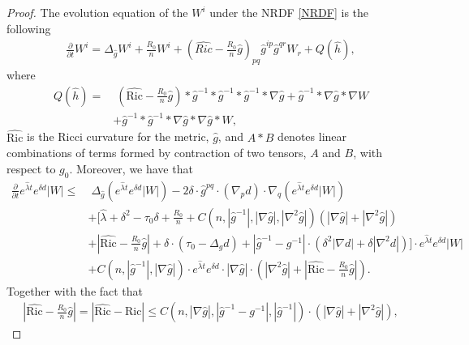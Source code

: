 \documentclass[12pt]{amsart}
\begin{document}
\begin{proof}
The evolution equation of the $W^{i}$ under the NRDF \eqref{NRDF} is the following 
\begin{align}
    \frac{\partial}{\partial t} W^{i} = \Delta_{\hat{g}} W^{i} + \frac{R_0}{n}W^{i} + (\hat{Ric} - \frac{R_0}{n} \hat{g})_{pq} \hat{g}^{ip} \hat{g}^{qr}W_{r} + Q(\hat{h}),
\end{align}
where 
\begin{equation}
    \begin{split}
        Q(\hat{h}) 
        =&\; (\hat{\mathrm{Ric}} - \frac{R_0}{n}\hat{g}) * \hat{g}^{-1}* \hat{g}^{-1}* \hat{g}^{-1}*\nabla\hat{g} + \hat{g}^{-1} * \nabla\hat{g} * \nabla W\\
        &+ \hat{g}^{-1}* \hat{g}^{-1} * \nabla\hat{g} * \nabla\hat{g} * W,
    \end{split}
\end{equation}
$\hat{\mathrm{Ric}}$ is the Ricci curvature for the metric, $\hat{g}$, and $A*B$ denotes linear combinations of terms formed by contraction of two tensors, $A$ and $B$, with respect to $g_0$. Moreover, we have that 
\begin{equation*}
    \begin{split}
        \frac{\partial}{\partial t} e^{\hat{\lambda} t}e^{\delta d}|W| \leq&\; \Delta_{\hat{g}}  \left( e^{\hat{\lambda} t}e^{\delta d} |W| \right) - 2\delta \cdot \hat{g}^{pq}\cdot (\nabla_p d) \cdot \nabla_q \left( e^{\hat{\lambda} t}e^{\delta d}|W| \right) \\ 
        &+ \bigg[ \hat{\lambda} + \delta^2 - \tau_0 \delta + \frac{R_0}{n} + C(n, |\hat{g}^{-1}|, |\nabla\hat{g}|, |\nabla^2 \hat{g}|)(|\nabla\hat{g}| + |\nabla^2 \hat{g}|)\\
        &+ |\hat{\mathrm{Ric}} - \frac{R_0}{n}\hat{g}| + \delta\cdot (\tau_0 - \Delta_g d) + |\hat{g}^{-1} - g^{-1}|\cdot (\delta^2|\nabla d| + \delta|\nabla^2 d|) \bigg] \cdot e^{\hat{\lambda} t}e^{\delta d}|W|\\ 
        &+ C(n, |\hat{g}^{-1}|, |\nabla \hat{g}|)\cdot e^{\hat{\lambda}t}e^{\delta d} \cdot |\nabla \hat{g}|\cdot (|\nabla^2\hat{g}| + |\hat{\mathrm{Ric}} - \frac{R_0}{n}\hat{g}|).
    \end{split}
\end{equation*}
Together with the fact that 
\begin{align}
    |\hat{\mathrm{Ric}} - \frac{R_0}{n}\hat{g}| = |\hat{\mathrm{Ric}} - \mathrm{Ric}|
    \leq  C(n, |\nabla\hat{g}|, |\hat{g}^{-1} - g^{-1}|, |\hat{g}^{-1}|)\cdot (|\nabla \hat{g}| + |\nabla^2 \hat{g}|),  

\end{align}
\end{proof}
\end{document}
